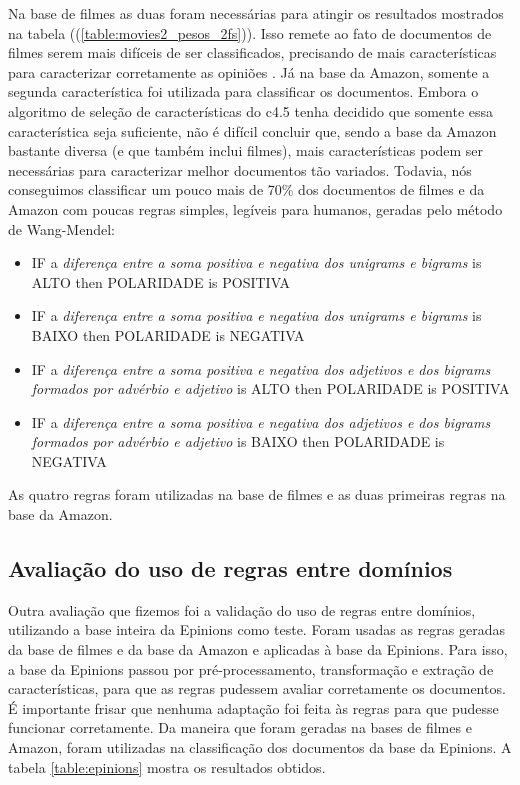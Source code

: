 \documentclass[template.tex]{subfiles}
\begin{document}
Na base de filmes as duas foram necessárias para atingir os resultados mostrados na tabela ((\ref{table:movies2_pesos_2fs})). Isso remete ao fato de documentos de filmes serem mais difíceis de ser classificados, precisando de mais características para caracterizar corretamente as opiniões \cite{turney2002thumbs, pang2004sentimental, chaovalit2005movie, ohana2009sentiment}. Já na base da Amazon, somente a segunda característica foi utilizada para classificar os documentos. Embora o algoritmo de seleção de características do c4.5 tenha decidido que somente essa característica seja suficiente, não é difícil concluir que, sendo a base da Amazon bastante diversa (e que também inclui filmes), mais características podem ser necessárias para caracterizar melhor documentos tão variados.
Todavia, nós conseguimos classificar um pouco mais de 70\% dos documentos de filmes e da Amazon com poucas regras simples, legíveis para humanos, geradas pelo método de Wang-Mendel:

\begin{itemize}
\item IF a \textit{diferença entre a soma positiva e negativa dos unigrams e bigrams} is ALTO then POLARIDADE is POSITIVA
\item IF a \textit{diferença entre a soma positiva e negativa dos unigrams e bigrams} is BAIXO then POLARIDADE is NEGATIVA
\item IF a \textit{diferença entre a soma positiva e negativa dos adjetivos e dos bigrams formados por advérbio e adjetivo} is ALTO then POLARIDADE is POSITIVA
\item IF a \textit{diferença entre a soma positiva e negativa dos adjetivos e dos bigrams formados por advérbio e adjetivo} is BAIXO then POLARIDADE is NEGATIVA
\end{itemize}

As quatro regras foram utilizadas na base de filmes e as duas primeiras regras na base da Amazon.

\subsection{Avaliação do uso de regras entre domínios}

Outra avaliação que fizemos foi a validação do uso de regras entre domínios, utilizando a base inteira da Epinions como teste. Foram usadas as regras geradas da base de filmes e da base da Amazon e aplicadas à base da Epinions. Para isso, a base da Epinions passou por pré-processamento, transformação e extração de características, para que as regras pudessem avaliar corretamente os documentos. É importante frisar que nenhuma adaptação foi feita às regras para que pudesse funcionar corretamente. Da maneira que foram geradas na bases de filmes e Amazon, foram utilizadas na classificação dos documentos da base da Epinions. A tabela \ref{table:epinions} mostra os resultados obtidos.
\end{document}
